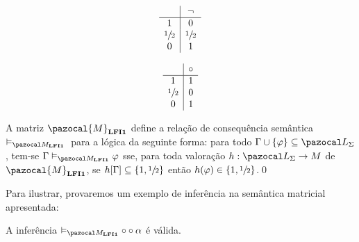 \begin{definicao}
            \vspace{0.5cm}

            \begin{minipage}{0.4\textwidth}
                \[
                    \begin{array}{c|c}%
                                    & \neg        \\
                        \hline%
                        1           & 0           \\
                        \meio{} & \meio{} \\
                        0           & 1           \\
                    \end{array}
                \]
            \end{minipage}
            \begin{minipage}{0.3\textwidth}
                \[
                    \begin{array}{c|c}%
                                    & \circ   \\
                        \hline%
                        1           & 1         \\
                        \meio{} & 0         \\
                        0           & 1         \\
                    \end{array}
                \]
            \end{minipage}

            \vspace{\baselineskip}

            \noindent
            A matriz $\pazocal{M}_{\lfium{}}$ define a relação de consequência semântica $\conmat{}$ para a lógica \lfium{} da seguinte forma: para todo $\Gamma \cup \{\phi\} \subseteq \ling{}$, tem-se $\Gamma \conmat \phi$ sse, para toda valoração $h : \ling{} \to M$ de $\pazocal{M}_{\lfium{}}$, se $h[\Gamma] \subseteq \{1, \sfrac{1}{2}{}\}$ então $h(\varphi) \in \{1, \sfrac{1}{2}{}\}$.\qed{}
        \end{definicao}

        Para ilustrar, provaremos um exemplo de inferência na semântica matricial apresentada:

        \begin{exemplo}\label{ex:2}
            A inferência $ \conmat \circ \circ \alpha$ é válida.
        \end{exemplo}

